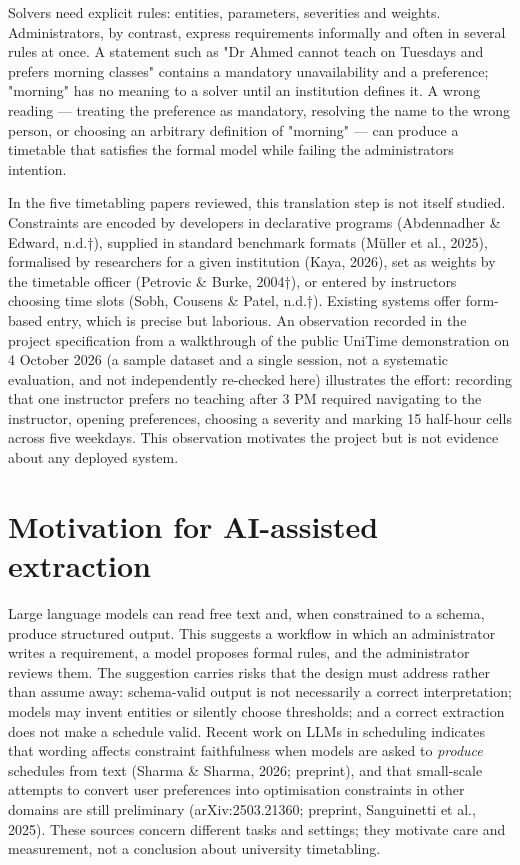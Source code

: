 \documentclass[
  11pt,a4paper,oneside]{report}
\begin{document}
Solvers need explicit rules: entities, parameters, severities and
weights. Administrators, by contrast, express requirements informally
and often in several rules at once. A statement such as "Dr Ahmed cannot
teach on Tuesdays and prefers morning classes" contains a mandatory
unavailability and a preference; "morning" has no meaning to a solver
until an institution defines it. A wrong reading --- treating the
preference as mandatory, resolving the name to the wrong person, or
choosing an arbitrary definition of "morning" --- can produce a
timetable that satisfies the formal model while failing the
administrator\textquotesingle s intention.

In the five timetabling papers reviewed, this translation step is not itself
studied. Constraints are encoded by developers in declarative programs
(Abdennadher \& Edward, n.d.†),
supplied in standard benchmark formats (Müller et al., 2025), formalised
by researchers for a given institution (Kaya, 2026), set as weights by
the timetable officer (Petrovic \& Burke, 2004†), or entered by
instructors choosing time slots (Sobh, Cousens \& Patel, n.d.†).
Existing systems offer form-based entry, which is precise but laborious.
An observation recorded in the project specification from a walkthrough
of the public UniTime demonstration on 4 October 2026 (a sample dataset
and a single session, not a systematic evaluation, and not independently
re-checked here) illustrates the effort: recording that one instructor
prefers no teaching after 3 PM required navigating to the instructor,
opening preferences, choosing a severity and marking 15 half-hour cells
across five weekdays. This observation motivates the project but is not
evidence about any deployed system.

\hypertarget{motivation-for-ai-assisted-extraction}{%
\section{Motivation for AI-assisted
extraction}\label{motivation-for-ai-assisted-extraction}}

Large language models can read free text and, when constrained to a
schema, produce structured output. This suggests a workflow in which an
administrator writes a requirement, a model proposes formal rules, and
the administrator reviews them. The suggestion carries risks that the
design must address rather than assume away: schema-valid output is not
necessarily a correct interpretation; models may invent entities or
silently choose thresholds; and a correct extraction does not make a
schedule valid. Recent work on LLMs in scheduling indicates that wording
affects constraint faithfulness when models are asked to \emph{produce}
schedules from text (Sharma \& Sharma, 2026; preprint), and that
small-scale attempts to convert user preferences into optimisation
constraints in other domains are still preliminary (arXiv:2503.21360;
preprint, Sanguinetti et al., 2025). These sources concern different tasks
and settings; they motivate care and measurement, not a conclusion about
university timetabling.
\end{document}
